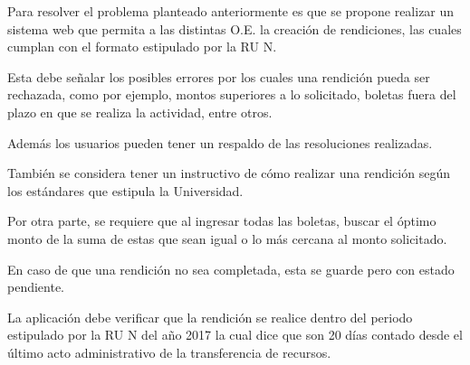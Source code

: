 Para resolver el problema planteado anteriormente es que se propone realizar un sistema web que permita a las distintas O.E. la creación de rendiciones, las cuales cumplan con el formato estipulado por la RU N.

Esta debe señalar los posibles errores por los cuales una rendición pueda ser rechazada, como por ejemplo, montos superiores a lo solicitado, boletas fuera del plazo en que se realiza la actividad, entre otros.

Además los usuarios pueden tener un respaldo de las resoluciones realizadas.

También se considera tener un instructivo de cómo realizar una rendición según los estándares que estipula la Universidad.   

Por otra parte, se requiere que al ingresar todas las boletas, buscar el óptimo monto de la suma de estas que sean igual o lo más cercana al monto solicitado.

En caso de que una rendición no sea completada, esta se guarde pero con estado pendiente.

La aplicación debe verificar que la rendición se realice dentro del periodo estipulado por la RU N del año 2017 la cual dice que son 20 días contado desde el último acto administrativo de la transferencia de recursos.